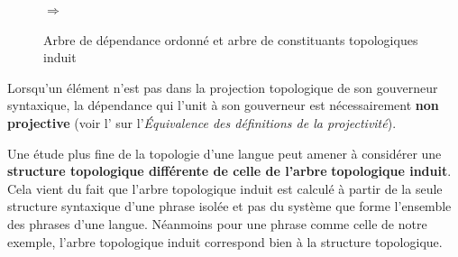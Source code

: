 \begin{figure}
\begin{minipage}[c]{.45\linewidth}\centering
{}
\end{minipage}\begin{minipage}[c]{.1\linewidth}\centering
$\Rightarrow$
\end{minipage}\begin{minipage}[c]{.45\linewidth}\centering
{}
\end{minipage}
\caption{\label{fig:}Arbre de dépendance ordonné et arbre de constituants topologiques induit}

\end{figure}

Lorsqu’un élément n’est pas dans la projection topologique de son gouverneur syntaxique, la dépendance qui l’unit à son gouverneur est nécessairement \textbf{non projective} (voir l’ sur l’\textit{Équivalence des définitions de la projectivité}).

Une étude plus fine de la topologie d’une langue peut amener à considérer une \textbf{structure topologique différente de celle de l’arbre} \textbf{topologique induit}. Cela vient du fait que l’arbre topologique induit est calculé à partir de la seule structure syntaxique d’une phrase isolée et pas du système que forme l’ensemble des phrases d’une langue. Néanmoins pour une phrase comme celle de notre exemple, l’arbre topologique induit correspond bien à la structure topologique.

